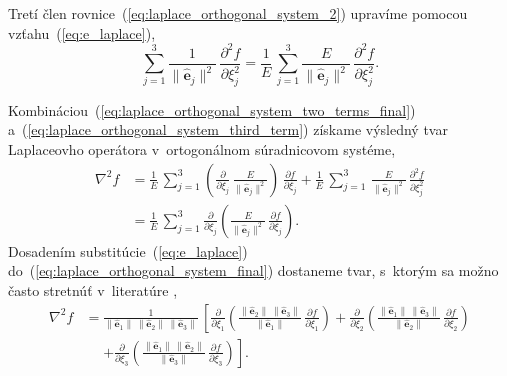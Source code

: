 \documentclass[a4paper, 12pt]{book}
\let\vec\mathbf
\begin{document}
Tretí člen rovnice~(\ref{eq:laplace_orthogonal_system_2}) upravíme pomocou 
vzťahu~(\ref{eq:e_laplace}),
%
\begin{equation}
\label{eq:laplace_orthogonal_system_third_term}
\sum_{j = 1}^3 \frac{1}{\| \hat{\vec e}_j \|^2} \, \frac{\partial^2 f}{\partial 
\xi_j^2} = \frac{1}{E} \, \sum_{j = 1}^3 \frac{E}{\| \hat{\vec e}_j \|^2} \, 
\frac{\partial^2 f}{\partial \xi_j^2}{.}
\end{equation}

Kombináciou~(\ref{eq:laplace_orthogonal_system_two_terms_final}) 
a~(\ref{eq:laplace_orthogonal_system_third_term}) získame výsledný tvar 
Laplaceovho operátora v~ortogonálnom súradnicovom systéme,
%
\begin{equation}
\label{eq:laplace_orthogonal_system_final}
\begin{split}
\nabla^2 f &= \frac{1}{E} \, \sum_{j = 1}^3 \left( \frac{\partial}{\partial 
\xi_j} \, \frac{E}{\| \hat{\vec e}_j \|^2}\right) \, \frac{\partial f}{\partial 
\xi_j} + \frac{1}{E} \, \sum_{j = 1}^3 \, \frac{E}{\| \hat{\vec e}_j \|^2} \, 
\frac{\partial^2 f}{\partial \xi_j^2}\\
%
&= \frac{1}{E} \, \sum_{j = 1}^3 \frac{\partial}{\partial \xi_j} \left( 
\frac{E}{\| \hat{\vec e}_j  \|^2} \, \frac{\partial f}{\partial \xi_j} 
\right){.}
\end{split}
\end{equation}
%
Dosadením substitúcie~(\ref{eq:e_laplace}) 
do~(\ref{eq:laplace_orthogonal_system_final}) dostaneme tvar, s~ktorým sa možno 
často stretnúť v~literatúre \parencite[napríklad][]{MoritzPhysicalGeodesy},
%
\begin{equation}
\label{eq:laplace_orthogonal_system_final_2}
\begin{split}
\nabla^2 f &= \frac{1}{\| \hat{\vec e}_1 \| \, \| \hat{\vec e}_2 \| \, \| 
\hat{\vec e}_3 \|} \, \left[ \frac{\partial}{\partial \xi_1} \left( \frac{\| 
\hat{\vec e}_2 \| \, \| \hat{\vec e}_3 \|}{\| \hat{\vec e}_1 \|} \, 
\frac{\partial f}{\partial \xi_1} \right) + \frac{\partial}{\partial \xi_2} 
\left( \frac{\| \hat{\vec e}_1 \| \, \| \hat{\vec e}_3 \|}{\| \hat{\vec e}_2 
\|} \, \frac{\partial f}{\partial \xi_2} \right) \right.\\
%
&\phantom{={}}\left. + \frac{\partial}{\partial \xi_3} \left( \frac{\| 
\hat{\vec e}_1 \| \, \| \hat{\vec e}_2 \|}{\| \hat{\vec e}_3 \|} \, 
\frac{\partial f}{\partial \xi_3} \right)\right]{.}
\end{split}
\end{equation}
\end{document}
